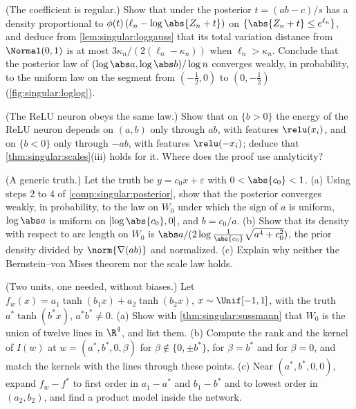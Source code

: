 \begin{refsection}
\begin{exercises}
\item \consolidation (The coefficient is regular.) Show that under the posterior $t=(ab-\hat c)/s$ has a density proportional to $\phi(t)\,(\ell_n-\log\abs{Z_n+t})$ on $\{\abs{Z_n+t}\le e^{\ell_n}\}$, and deduce from \cref{lem:singular:loggauss} that its total variation distance from $\Normal(0,1)$ is at most $3\kappa_n/(2(\ell_n-\kappa_n))$ when $\ell_n>\kappa_n$. Conclude that the posterior law of $(\log\abs a,\log\abs b)/\log n$ converges weakly, in probability, to the uniform law on the segment from $(-\frac12,0)$ to $(0,-\frac12)$ (\cref{fig:singular:loglog}).\label{ex:singular:coefficient}

\item \consolidation (The ReLU neuron obeys the same law.) Show that on $\{b>0\}$ the energy of the ReLU neuron depends on $(a,b)$ only through $ab$, with features $\relu(x_i)$, and on $\{b<0\}$ only through $-ab$, with features $\relu(-x_i)$; deduce that \cref{thm:singular:scales}(iii) holds for it. Where does the proof use analyticity?\label{ex:singular:relu}

\item \byhand (A generic truth.) Let the truth be $y=c_0x+\varepsilon$ with $0<\abs{c_0}<1$. (a) Using steps 2 to 4 of \cref{comp:singular:posterior}, show that the posterior converges weakly, in probability, to the law on $W_0$ under which the sign of $a$ is uniform, $\log\abs a$ is uniform on $[\log\abs{c_0},0]$, and $b=c_0/a$. (b) Show that its density with respect to arc length on $W_0$ is $\abs a/(2\log\frac1{\abs{c_0}}\sqrt{a^4+c_0^2})$, the prior density divided by $\norm{\nabla(ab)}$ and normalized. (c) Explain why neither the Bernstein--von Mises theorem nor the scale law holds.\label{ex:singular:generic}

\item \byhand\hard (Two units, one needed, without biases.) Let $f_w(x)=a_1\tanh(b_1x)+a_2\tanh(b_2x)$, $x\sim\Unif[-1,1]$, with the truth $a^*\tanh(b^*x)$, $a^*b^*\ne0$. (a) Show with \cref{thm:singular:sussmann} that $W_0$ is the union of twelve lines in $\R^4$, and list them. (b) Compute the rank and the kernel of $I(w)$ at $w=(a^*,b^*,0,\beta)$ for $\beta\notin\{0,\pm b^*\}$, for $\beta=b^*$ and for $\beta=0$, and match the kernels with the lines through these points. (c) Near $(a^*,b^*,0,0)$, expand $f_w-f^*$ to first order in $a_1-a^*$ and $b_1-b^*$ and to lowest order in $(a_2,b_2)$, and find a product model inside the network. \label{ex:singular:twounitsfree}


\end{exercises}
\end{refsection}
